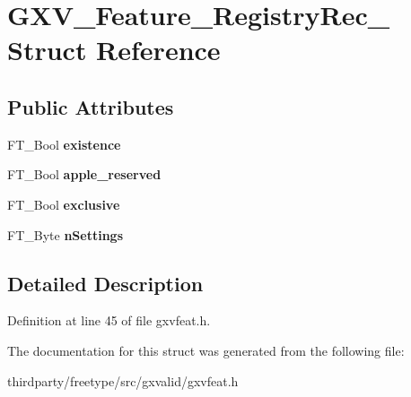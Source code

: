 \hypertarget{struct_g_x_v___feature___registry_rec__}{}\section{G\+X\+V\+\_\+\+Feature\+\_\+\+Registry\+Rec\+\_\+ Struct Reference}
\label{struct_g_x_v___feature___registry_rec__}
\subsection*{Public Attributes}
\begin{DoxyCompactItemize}
\item 
\mbox{\label{struct_g_x_v___feature___registry_rec___ad6229ea84325c8e3bada72b66ed5ef2a}} 
F\+T\+\_\+\+Bool {\bfseries existence}
\item 
\mbox{\label{struct_g_x_v___feature___registry_rec___a4984d5dff0d739890c2a0e91d0faf0ca}} 
F\+T\+\_\+\+Bool {\bfseries apple\+\_\+reserved}
\item 
\mbox{\label{struct_g_x_v___feature___registry_rec___a5eb5fc0abfc632a5a0d3920d62e45f41}} 
F\+T\+\_\+\+Bool {\bfseries exclusive}
\item 
\mbox{\label{struct_g_x_v___feature___registry_rec___a541d0cd9328653df04dc3566f8acece8}} 
F\+T\+\_\+\+Byte {\bfseries n\+Settings}
\end{DoxyCompactItemize}


\subsection{Detailed Description}


Definition at line 45 of file gxvfeat.\+h.



The documentation for this struct was generated from the following file\+:\begin{DoxyCompactItemize}
\item 
thirdparty/freetype/src/gxvalid/gxvfeat.\+h\end{DoxyCompactItemize}
